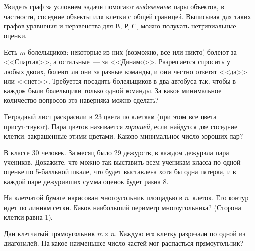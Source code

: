 Увидеть граф за условием задачи помогают \emph{выделенные} пары объектов,
в частности, соседние объекты или клетки с общей границей.
Выписывая для таких графов уравнения и неравенства для
$\text{В}$, $\text{Р}$, $\text{С}$, можно получать нетривиальные оценки.

\begin{problems}

\item
Есть $m$ болельщиков: некоторые из них (возможно, все или никто) болеют за
<<Спартак>>, а остальные~--- за <<Динамо>>.
Разрешается спросить у любых двоих, болеют ли они за разные команды, и они
честно ответят <<да>> или <<нет>>.
Требуется посадить болельщиков в два автобуса так, чтобы в каждом были
болельщики только одной команды.
За какое минимальное количество вопросов это наверняка можно сделать?

\item
Тетрадный лист раскрасили в 23 цвета по клеткам (при этом все цвета
присутствуют).
Пара цветов называется \emph{хорошей,} если найдутся две соседние клетки,
закрашенные этими цветами.
Каково минимальное число хороших пар?

\item
В классе 30 человек.
За месяц было 29 дежурств, в каждом дежурила пара учеников.
Докажите, что можно так выставить всем ученикам класса по одной оценке
по 5-балльной шкале, что будет выставлена хотя бы одна пятерка, и в каждой паре
дежуривших сумма оценок будет равна 8.

\item
На клетчатой бумаге нарисован многоугольник площадью в $n$~клеток.
Его контур идет по линиям сетки.
Каков наибольший периметр многоугольника?
(Сторона клетки равна 1).

\item
Дан клетчатый прямоугольник $m \times n$.
Каждую его клетку разрезали по одной из диагоналей.
На какое наименьшее число частей мог распасться прямоугольник?

\end{problems}

